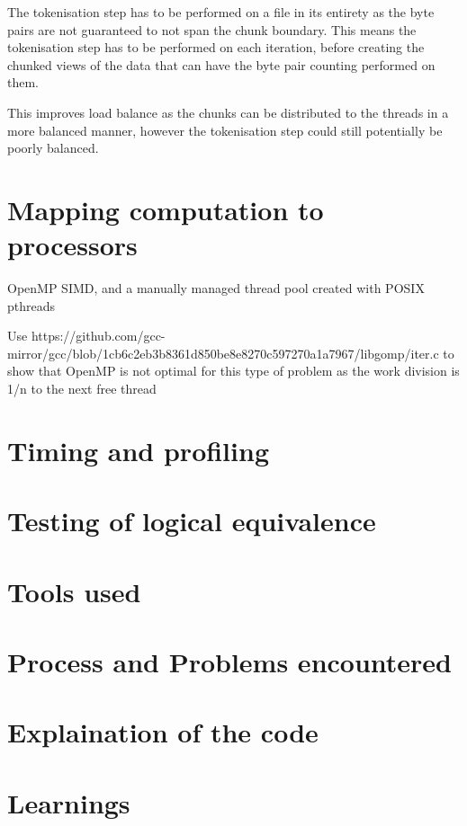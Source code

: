 \documentclass{article}
\begin{document}
The tokenisation step has to be performed on a file in its entirety as the byte pairs are not guaranteed to not 
span the chunk boundary. This means the tokenisation step has to be performed on each iteration, before creating 
the chunked views of the data that can have the byte pair counting performed on them. 

This improves load balance as the chunks can be distributed to the threads in a more balanced manner, however the
tokenisation step could still potentially be poorly balanced.





\section{Mapping computation to processors}
OpenMP SIMD, and a manually managed thread pool created with POSIX pthreads

Use https://github.com/gcc-mirror/gcc/blob/1cb6c2eb3b8361d850be8e8270c597270a1a7967/libgomp/iter.c to show 
that OpenMP is not optimal for this type of problem as the work division is 1/n to the next free thread

\section{Timing and profiling}

\section{Testing of logical equivalence}

\section{Tools used}

\section{Process and Problems encountered}

\section{Explaination of the code}

\section{Learnings}
\end{document}
